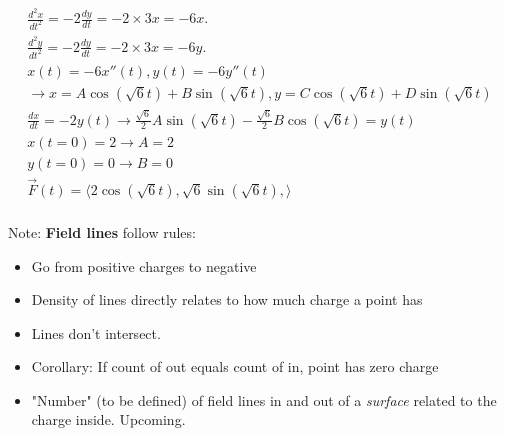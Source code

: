 \documentclass[11pt, oneside]{article}   	%
\begin{document}
\begin{align}
\frac{d^2x}{dt^2} = -2 \frac{dy}{dt}= -2 \times 3x = -6x.\\
\frac{d^2y}{dt^2} = -2 \frac{dy}{dt}= -2 \times 3x = -6y.\\
x(t) = -6x''(t), y(t) = -6y''(t) \\
\rightarrow x = A\cos(\sqrt{6}t)+ B\sin(\sqrt{6}t),  y = C\cos(\sqrt{6}t)+ D\sin(\sqrt{6}t) \\
\frac{dx}{dt} = -2y(t) \rightarrow   \frac{\sqrt{6}}{2}A\sin(\sqrt{6}t)- \frac{\sqrt{6}}{2}B\cos(\sqrt{6}t)  = y(t) \\
x(t=0) = 2 \rightarrow A = 2 \\
y(t=0) = 0 \rightarrow B = 0 \\
\overrightarrow{F}(t) = \langle 2\cos(\sqrt{6}t), \sqrt{6}\sin(\sqrt{6}t),\rangle \\
\end{align}

Note: \textbf{Field lines} follow rules:
\begin{itemize}
\item Go from positive charges to negative
\item Density of lines directly relates to how much charge a point has
\item Lines don't intersect.
\item Corollary: If count of out equals count of in, point has zero charge
\item "Number" (to be defined) of field lines in and out of a \emph{surface} related to the charge inside.  Upcoming.
\end{itemize}
\end{document}
